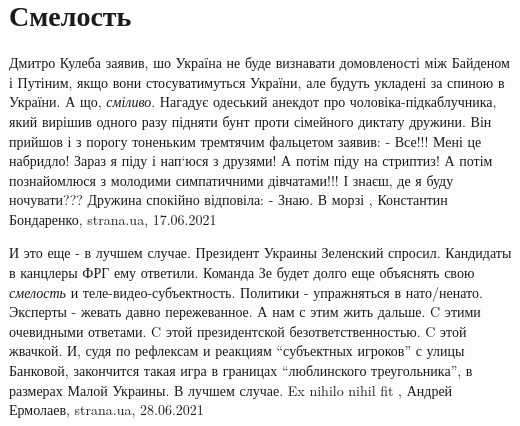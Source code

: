  
 
 
 
 
\chapter{Смелость}
\label{sec:slova.smelost}

Дмитро Кулеба заявив, шо Україна не буде визнавати домовленості між Байденом і
Путіним, якщо вони стосуватимуться України, але будуть укладені за спиною в
України.  А що, \emph{сміливо}. Нагадує одеський анекдот про
чоловіка-підкаблучника, який вирішив одного разу підняти бунт проти сімейного
диктату дружини. Він прийшов і з порогу тоненьким тремтячим фальцетом заявив: -
Все!!! Мені це набридло! Зараз я піду і нап‘юся з друзями! А потім піду на
стриптиз! А потім познайомлюся з молодими симпатичними дівчатами!!! І знаєш, де
я буду ночувати???  Дружина спокійно відповіла: - Знаю. В морзі
, 
Константин Бондаренко, strana.ua, 17.06.2021

И это еще - в лучшем случае.  Президент Украины Зеленский спросил.  Кандидаты в
канцлеры ФРГ ему ответили.  Команда Зе будет долго еще объяснять свою \emph{смелость}
и теле-видео-субъектность. Политики - упражняться в нато/ненато. Эксперты -
жевать давно пережеванное.  А нам с этим жить дальше. C этими очевидными
ответами. C этой президентской безответственностью. C этой жвачкой.  И, судя по
рефлексам и реакциям \enquote{субъектных игроков} с улицы Банковой, закончится такая
игра в границах \enquote{люблинского треугольника}, в размерах Малой Украины. В лучшем
случае.  Ex nihilo nihil fit
, 
Андрей Ермолаев, strana.ua, 28.06.2021

